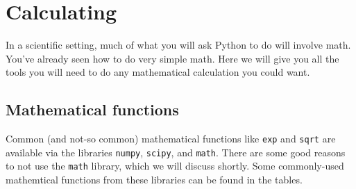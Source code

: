 \chapter{Calculating}
\label{chap:Calculating}
In a scientific setting, much of what you will ask Python to do will
involve math.  You've already seen how to do very simple math. Here we
will give you all the tools you will need to do any mathematical
calculation you could want.


\section{Mathematical functions}
 Common (and not-so common) mathematical functions like \texttt{exp}
and \texttt{sqrt} are available via the libraries \texttt{numpy},
\texttt{scipy}, and \texttt{math}.  There are some good reasons to not
use the \texttt{math} library, which we will discuss shortly.  Some
commonly-used mathemtical functions from these libraries can be found
in the tables.

